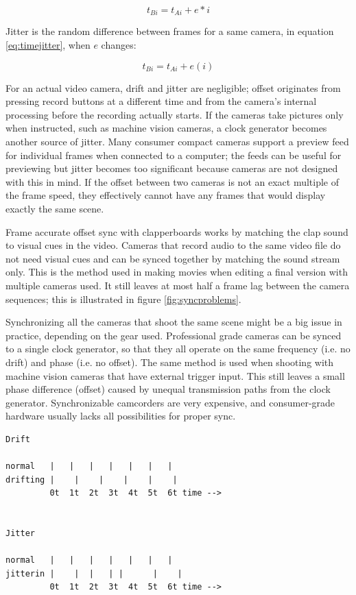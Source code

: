 \begin{equation} \label{eq:timedrift}
	t_{Bi} = t_{Ai} + e * i
\end{equation}

Jitter is the random difference between frames for a same camera, in equation \ref{eq:timejitter}, when $e$ changes:

\begin{equation} \label{eq:timejitter}
	t_{Bi} = t_{Ai} + e(i)
\end{equation}

For an actual video camera, drift and jitter are negligible; offset originates from pressing record buttons at a different time and from the camera's internal processing before the recording actually starts.
If the cameras take pictures only when instructed, such as machine vision cameras, a clock generator becomes another source of jitter.
Many consumer compact cameras support a preview feed for individual frames when connected to a computer; the feeds can be useful for previewing but jitter becomes too significant because cameras are not designed with this in mind.
If the offset between two cameras is not an exact multiple of the frame speed, they effectively cannot have any frames that would display exactly the same scene.

Frame accurate offset sync with clapperboards works by matching the clap sound to visual cues in the video.
Cameras that record audio to the same video file do not need visual cues and can be synced together by matching the sound stream only.
This is the method used in making movies when editing a final version with multiple cameras used.
It still leaves at most half a frame lag between the camera sequences; this is illustrated in figure \ref{fig:syncproblems}.

Synchronizing all the cameras that shoot the same scene might be a big issue in practice, depending on the gear used.
Professional grade cameras can be synced to a single clock generator, so that they all operate on the same frequency (i.e. no drift) and phase (i.e. no offset).
The same method is used when shooting with machine vision cameras that have external trigger input.
This still leaves a small phase difference (offset) caused by unequal transmission paths from the clock generator.
Synchronizable camcorders are very expensive, and consumer-grade hardware usually lacks all possibilities for proper sync.

\begin{verbatim}
Drift

normal   |   |   |   |   |   |   |
drifting |    |    |    |    |    |
         0t  1t  2t  3t  4t  5t  6t time -->


Jitter

normal   |   |   |   |   |   |   |
jitterin |    |  |   | |      |    |
         0t  1t  2t  3t  4t  5t  6t time -->
\end{verbatim}

